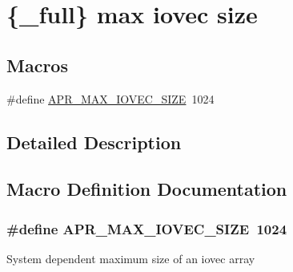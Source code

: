 \hypertarget{group__apr__file__writev}{\section{\{\-\_\-full\} max iovec size}
\label{group__apr__file__writev}
}
\subsection*{Macros}
\begin{DoxyCompactItemize}
\item 
\#define \hyperlink{group__apr__file__writev_gae04a4721139b2b252ea20e68883da4b4}{A\-P\-R\-\_\-\-M\-A\-X\-\_\-\-I\-O\-V\-E\-C\-\_\-\-S\-I\-Z\-E}~1024
\end{DoxyCompactItemize}


\subsection{Detailed Description}


\subsection{Macro Definition Documentation}
\hypertarget{group__apr__file__writev_gae04a4721139b2b252ea20e68883da4b4}{
\subsubsection[{A\-P\-R\-\_\-\-M\-A\-X\-\_\-\-I\-O\-V\-E\-C\-\_\-\-S\-I\-Z\-E}]{\setlength{\rightskip}{0pt plus 5cm}\#define A\-P\-R\-\_\-\-M\-A\-X\-\_\-\-I\-O\-V\-E\-C\-\_\-\-S\-I\-Z\-E~1024}}\label{group__apr__file__writev_gae04a4721139b2b252ea20e68883da4b4}
System dependent maximum size of an iovec array 